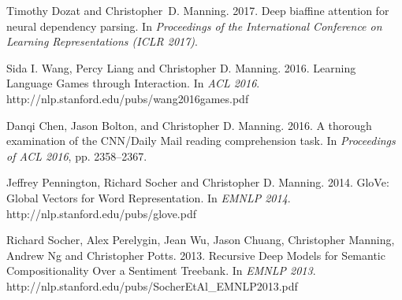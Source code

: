 \documentclass[11pt]{article}
\def\url#1{{\small\sf #1}}
\begin{document}
\begin{vita}
\begin{Products (most closely related)}
\item Timothy Dozat and Christopher~D. Manning.
2017.
Deep biaffine attention for neural dependency parsing.
In {\em Proceedings of the International Conference on Learning
  Representations (ICLR 2017)}.

\item Sida I. Wang, Percy Liang and Christopher D. Manning. 2016.
Learning Language Games through Interaction.
In \emph{ACL 2016}. 
\url{http://nlp.stanford.edu/pubs/wang2016games.pdf}

\item Danqi Chen, Jason Bolton, and Christopher D. Manning. 2016. A
  thorough examination of the CNN\slash Daily Mail reading
  comprehension task. In \emph{Proceedings of ACL 2016}, pp. 2358--2367.

\item Jeffrey Pennington, Richard Socher and Christopher D. Manning. 2014.
GloVe: Global Vectors for Word Representation. In \emph{EMNLP 2014}. \url{http://nlp.stanford.edu/pubs/glove.pdf}

\item Richard Socher, Alex Perelygin, Jean Wu,  Jason Chuang,
  Christopher Manning, Andrew Ng and Christopher Potts. 2013.
Recursive Deep Models for Semantic Compositionality Over a Sentiment
Treebank. In \emph{EMNLP 2013}. \url{http://nlp.stanford.edu/pubs/SocherEtAl\_EMNLP2013.pdf}





\end{Products (most closely related)}
\end{vita}
\end{document}
